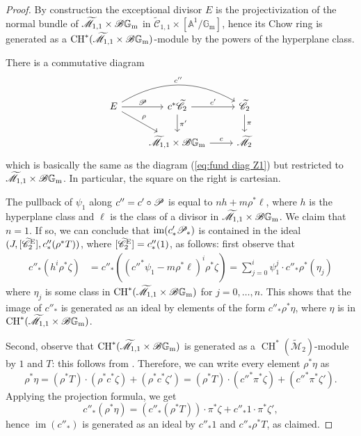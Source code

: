 \documentclass[a4paper, 10pt]{amsart}
\numberwithin{equation}{section}
\numberwithin{subsection}{section}
\theoremstyle{definition}
\theoremstyle{remark}
\renewcommand{\mathcal}{\mathscr}
\renewcommand\AA{\mathbb{A}} \newcommand\BB{\mathbb{B}}
\newcommand\GG{\mathbb{G}} \newcommand\HH{\mathbb{H}}
\newcommand\rmm{\mathrm{m}} \newcommand\rmn{\mathrm{n}}
\newcommand\im[1]{\operatorname{im}(#1)}
\newcommand{\gm}{\GG_{\rmm}}
\newcommand{\Mtilde}{\widetilde{\mathcal M}}
\newcommand{\Ctilde}{\widetilde{\mathcal C}}
\newcommand{\ch}[1][*]{\operatorname{CH}^{#1}}
\begin{document}
	\begin{proof}
		By construction the exceptional divisor $E$ is the projectivization of the normal bundle of $\Mtilde_{1,1}\times\cB\gm$ in $\Ctilde_{1,1}\times [\AA^1/\gm]$, hence its Chow ring is generated as a $\ch(\Mtilde_{1,1}\times\cB\gm)$-module by the powers of the hyperplane class.
		
		There is a commutative diagram
		\begin{equation*}
			\begin{tikzcd}
				E \ar[r, "\cP"] \ar[dr, "\rho"] \ar[rr, bend left, "c''"] & c^*\Ctilde_2 \ar[r, "c'"] \ar[d, "\pi'"] & \Ctilde_2 \ar[d, "\pi"] \\
				& \Mtilde_{1,1}\times\cB\gm \ar[r, "c"]    & \Mtilde_2
			\end{tikzcd}
		\end{equation*}
		which is basically the same as the diagram (\ref{eq:fund diag Z1}) but restricted to $\Mtilde_{1,1}\times\cB\gm$. In particular, the square on the right is cartesian.
		
		The pullback of $\psi_1$ along $c''=c'\circ\cP$ is equal to $nh + m\rho^*\ell$, where $h$ is the hyperplane class and $\ell$ is the class of a divisor in $\Mtilde_{1,1}\times\cB\gm$. We claim that $n=1$. If so, we can conclude that $\im{c'_*\cP_*}$ is contained in the ideal $(J,[\Ctilde_2^{\rm E}],c''_*(\rho^*T))$, where $[\Ctilde_2^{\rm E}]=c''_*(1)$, as follows: first observe that
		\begin{align*}
			c''_*(h^i \rho^*\zeta) &= c''_*(({c''}^*\psi_1 - m\rho^*\ell)^i \rho^*\zeta) = \sum_{j=0}^{i} \psi_1^j \cdot c''_*\rho^*(\eta_j) 
		\end{align*}
		where $\eta_j$ is some class in $\ch(\Mtilde_{1,1}\times \cB\gm)$ for $j=0,\dots,n$. This shows that the image of $c''_*$ is generated as an ideal by elements of the form $c''_*\rho^*\eta$, where $\eta$ is in $\ch(\Mtilde_{1,1}\times \cB\gm)$.
		
		Second, observe that $\ch(\Mtilde_{1,1}\times \cB\gm)$ is generated as a $\ch(\Mtilde_2)$-module by $1$ and $T$: this follows from . Therefore, we can write every element $\rho^*\eta$ as
		\[\rho^*\eta = (\rho^*T)\cdot (\rho^*c^*\zeta) + (\rho^*c^*\zeta') = (\rho^*T)\cdot ({c''}^*\pi^*\zeta) + ({c''}^*\pi^*\zeta'). \]
		Applying the projection formula, we get
		\[ c''_*(\rho^*\eta)=(c''_*(\rho^*T))\cdot \pi^*\zeta + c''_*1\cdot \pi^*\zeta', \]
		hence $\im{c''_*}$ is generated as an ideal by $c''_*1$ and $c''_*\rho^*T$, as claimed.
		

\end{proof}
\end{document}

